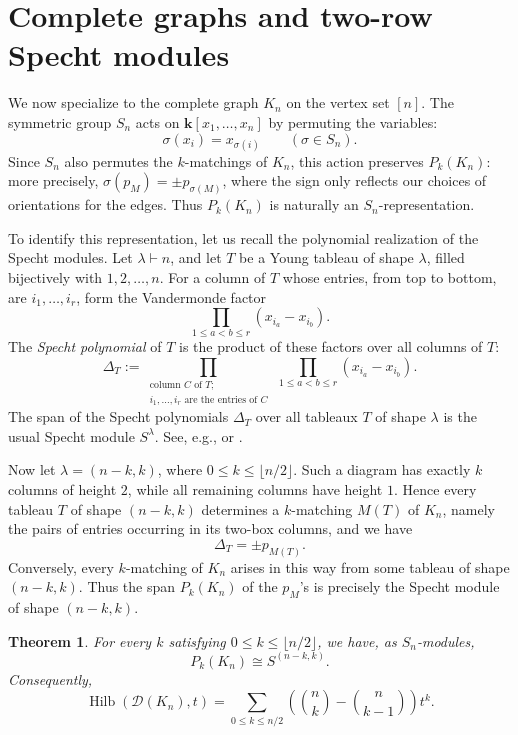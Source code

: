 \documentclass[12pt]{amsart}
\newtheorem{theorem}{Theorem}[section]
\theoremstyle{definition}
\theoremstyle{remark}
\newcommand{\kk}{\mathbf{k}}
\newcommand{\Hilb}{\operatorname{Hilb}}
\begin{document}
\section{Complete graphs and two-row Specht modules}

We now specialize to the complete graph $K_n$ on the vertex set $[n]$.
The symmetric group $S_n$ acts on $\kk[x_1,\ldots,x_n]$ by permuting the
variables:
\[
 \sigma(x_i)=x_{\sigma(i)}
 \qquad(\sigma\in S_n).
\]
Since $S_n$ also permutes the $k$-matchings of $K_n$, this action preserves
$P_k(K_n)$: more precisely, $\sigma(p_M)=\pm p_{\sigma(M)}$, where the sign
only reflects our choices of orientations for the edges.  Thus $P_k(K_n)$ is
naturally an $S_n$-representation.

To identify this representation, let us recall the polynomial realization of
the Specht modules.  Let $\lambda\vdash n$, and let $T$ be a Young tableau of
shape $\lambda$, filled bijectively with $1,2,\ldots,n$.  For a column of $T$
whose entries, from top to bottom, are $i_1,\ldots,i_r$, form the Vandermonde
factor
\[
 \prod_{1\leq a<b\leq r}(x_{i_a}-x_{i_b}).
\]
The \emph{Specht polynomial} of $T$ is the product of these factors over all
columns of $T$:
\[
 \Delta_T
 :=
 \prod_{\substack{\text{column }C\text{ of }T;\\
                   i_1,\ldots,i_r\text{ are the entries of }C}}
 \ \prod_{1\leq a<b\leq r}(x_{i_a}-x_{i_b}).
\]
The span of the Specht polynomials $\Delta_T$ over all tableaux $T$ of shape
$\lambda$ is the usual Specht module $S^\lambda$.
See, e.g., \cite[Satz 1]{Specht} or \cite[Theorem 5.6.1]{sga}.

Now let $\lambda=(n-k,k)$, where
$0\leq k\leq\lfloor n/2\rfloor$.  Such a diagram has exactly $k$ columns of
height $2$, while all remaining columns have height $1$.  Hence every tableau
$T$ of shape $(n-k,k)$ determines a $k$-matching $M(T)$ of $K_n$, namely the
pairs of entries occurring in its two-box columns, and we have
\[
 \Delta_T=\pm p_{M(T)}.
\]
Conversely, every $k$-matching of $K_n$ arises in this way from some tableau of
shape $(n-k,k)$.  Thus the span $P_k(K_n)$ of the $p_M$'s is precisely the
Specht module of shape $(n-k,k)$.

\begin{theorem}\label{thm:complete-specht}
For every $k$ satisfying $0\leq k\leq\lfloor n/2\rfloor$, we have,
as $S_n$-modules,
\[
 P_k(K_n)\cong S^{(n-k,k)}.
\]
Consequently,
\[
 \Hilb(\mathcal D(K_n),t)
 =\sum_{0\leq k\leq n/2}
 \left(\binom nk-\binom n{k-1}\right)t^k.
\]
\end{theorem}
\end{document}
